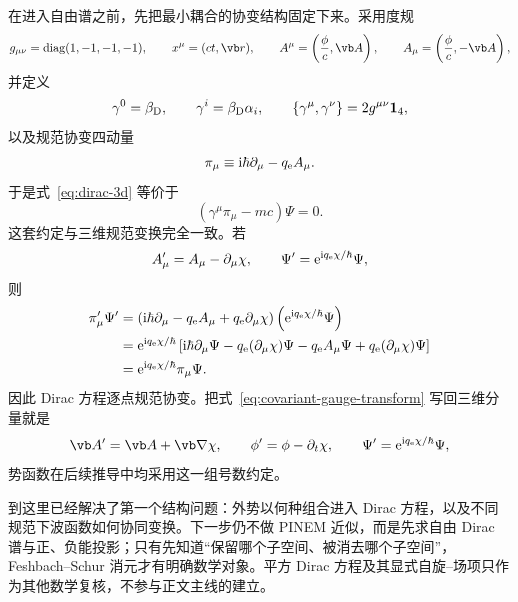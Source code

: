 在进入自由谱之前，先把最小耦合的协变结构固定下来。采用度规
\begin{equation}
 g_{\mu\nu}=\operatorname{diag}(1,-1,-1,-1),
 \qquad
 x^\mu=(ct,\vb r),
 \qquad
 A^\mu=\left(\frac{\phi}{c},\vb A\right),
 \qquad
 A_\mu=\left(\frac{\phi}{c},-\vb A\right),
 \label{eq:covariant-conventions}
\end{equation}
并定义
\begin{equation}
 \gamma^0=\beta_{\rm D},
 \qquad
 \gamma^i=\beta_{\rm D}\alpha_i,
 \qquad
 \{\gamma^\mu,\gamma^\nu\}=2g^{\mu\nu}\mathbf 1_4,
 \label{eq:gamma-def-clifford}
\end{equation}
以及规范协变四动量
\begin{equation}
 \pi_\mu\equiv \mathrm{i}\hbar\partial_\mu-q_{\rm e}A_\mu.
 \label{eq:covariant-pi}
\end{equation}
于是式~\cref{eq:dirac-3d} 等价于
\begin{equation}
 {\left(\gamma^\mu\pi_\mu-mc\right)\Psi=0.}
 \label{eq:dirac-covariant}
\end{equation}
这套约定与三维规范变换完全一致。若
\begin{equation}
 A_\mu' = A_\mu-\partial_\mu\chi,
 \qquad
 \Psi'=\mathrm{e}^{\mathrm{i} q_{\rm e}\chi/\hbar}\Psi,
 \label{eq:covariant-gauge-transform}
\end{equation}
则
\begin{align}
 \pi_\mu'\Psi'
 &=\left(\mathrm{i}\hbar\partial_\mu-q_{\rm e}A_\mu+q_{\rm e}\partial_\mu\chi\right)
 \left(\mathrm{e}^{\mathrm{i} q_{\rm e}\chi/\hbar}\Psi\right)\\
 &=\mathrm{e}^{\mathrm{i} q_{\rm e}\chi/\hbar}
 \left[\mathrm{i}\hbar\partial_\mu\Psi-q_{\rm e}(\partial_\mu\chi)\Psi
 -q_{\rm e}A_\mu\Psi+q_{\rm e}(\partial_\mu\chi)\Psi\right]\\
 &=\mathrm{e}^{\mathrm{i} q_{\rm e}\chi/\hbar}\pi_\mu\Psi.
 \label{eq:pi-gauge-covariance}
\end{align}
因此 Dirac 方程逐点规范协变。把式~\cref{eq:covariant-gauge-transform} 写回三维分量就是
\begin{equation}
 \vb A'=\vb A+\vb\nabla\chi,
 \qquad
 \phi'=\phi-\partial_t\chi,
 \qquad
 \Psi'=\ee^{\ii q_{\rm e}\chi/\hbar}\Psi,
 \label{eq:gauge-three-components}
\end{equation}
势函数在后续推导中均采用这一组号数约定。

到这里已经解决了第一个结构问题：外势以何种组合进入 Dirac 方程，以及不同规范下波函数如何协同变换。下一步仍不做 PINEM 近似，而是先求自由 Dirac 谱与正、负能投影；只有先知道“保留哪个子空间、被消去哪个子空间”，Feshbach--Schur 消元才有明确数学对象。平方 Dirac 方程及其显式自旋--场项只作为其他数学复核，不参与正文主线的建立。


